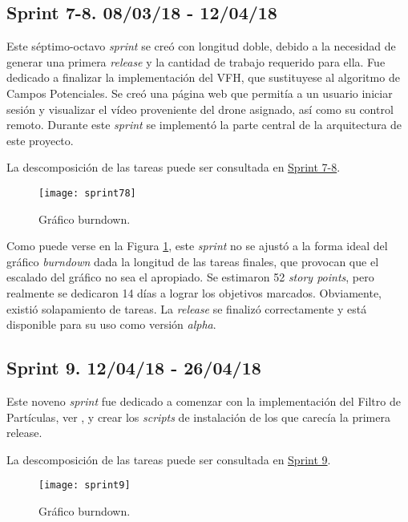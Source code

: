\subsection{Sprint 7-8. 08/03/18 - 12/04/18}

Este séptimo-octavo \emph{sprint} se creó con longitud doble, debido a la necesidad de generar una primera \emph{release} y la cantidad de trabajo requerido para ella. Fue dedicado a finalizar la implementación del VFH, que sustituyese al algoritmo de Campos Potenciales. Se creó una página web que permitía a un usuario iniciar sesión y visualizar el vídeo proveniente del drone asignado, así como su control remoto.
Durante este \emph{sprint} se implementó la parte central de la arquitectura de este proyecto.

La descomposición de las tareas puede ser consultada en \href{https://github.com/mbm0089/gii_0_17.02_snsi/milestone/7?closed=1}{Sprint 7-8}.

\begin{figure}[H]
	\centering
	\texttt{[image: sprint78]}
	\caption[Burndown Sprint 7-8]{Gráfico burndown.}\label{fig:sprint78}
\end{figure}

Como puede verse en la Figura \ref{fig:sprint78}, este \emph{sprint} no se ajustó a la forma ideal del gráfico \emph{burndown} dada la longitud de las tareas finales, que provocan que el escalado del gráfico no sea el apropiado.
Se estimaron 52 \emph{story points}, pero realmente se dedicaron 14 días a lograr los objetivos marcados. Obviamente, existió solapamiento de tareas. La \emph{release} se finalizó correctamente y está disponible para su uso como versión \emph{alpha}.

\subsection{Sprint 9. 12/04/18 - 26/04/18}

Este noveno \emph{sprint} fue dedicado a comenzar con la implementación del Filtro de Partículas, ver \citep{art:PFTuto},  y crear los \emph{scripts} de instalación de los que carecía la primera release.

La descomposición de las tareas puede ser consultada en \href{https://github.com/mbm0089/gii_0_17.02_snsi/milestone/8?closed=1}{Sprint 9}.

\begin{figure}[H]
	\centering
	\texttt{[image: sprint9]}
	\caption[Burndown Sprint 9]{Gráfico burndown.}\label{fig:sprint9}
\end{figure}

